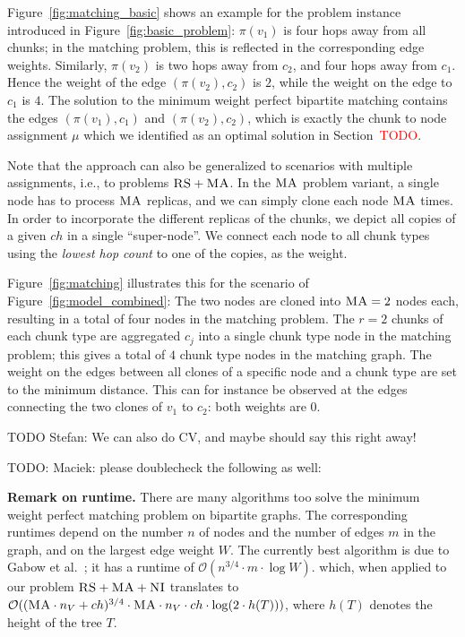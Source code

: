 \documentclass[9pt,twocolumn]{scrartcl}
\newcommand{\carlo}[1]{\textcolor{red}{#1}}
\newcommand{\MaFactor}{\ensuremath{\textsc{MA}}}
\newcommand{\RedundancyFactor}{\ensuremath{r}}
\newcommand{\VmChunkAssignment}{\mu}
\newcommand{\NodeMapping}{\pi}
\newcommand{\ChunkType}{\ensuremath{textsc{ct}}}
\newcommand{\VirtualNode}{v}
\newcommand{\achunk}{\ensuremath{c}}
\newcommand{\CC}{\textsc{NI}}
\newcommand{\RS}{\textsc{RS}}
\newcommand{\MA}{\textsc{MA}}
\newcommand{\Tree}{\ensuremath{T}}
\newcommand{\Vms}{\ensuremath{n_V}}
\newcommand{\ChunkTypes}{\ensuremath{ch}}
\begin{document}
Figure~\ref{fig:matching_basic} shows an example for the problem instance introduced in 
Figure~\ref{fig:basic_problem}: $\NodeMapping(\VirtualNode_1)$ is four hops
away from all chunks; in the matching problem, this is 
reflected in the corresponding edge
weights. Similarly, $\NodeMapping(\VirtualNode_2)$ is
two hops away from $\achunk_2$, and four hops away from $\achunk_1$. Hence the
weight of the edge $(\NodeMapping(\VirtualNode_2),\achunk_2)$ is $2$, while the
weight on the edge to $\achunk_1$ is $4$. The solution to the minimum weight
perfect bipartite matching contains the edges $(\NodeMapping(\VirtualNode_1),
\achunk_1)$ and $(\NodeMapping(\VirtualNode_2),
\achunk_2)$, which is exactly the chunk to node assignment $\VmChunkAssignment$
which we identified as an optimal solution in Section~\carlo{TODO}.

Note that the approach can also be generalized to scenarios with multiple assignments,
i.e., to problems 
$\RS+\MA$. In the $\MA$ problem variant, a single node has to process 
$\MaFactor$ replicas, and we can simply clone each node $\MaFactor$ times.
In order to incorporate the different
replicas of the chunks, we depict all copies of a given $\ChunkTypes$ in a
single %
``super-node''. We connect each node to all chunk types using the
\emph{lowest hop count} to one of the copies, as the weight.

Figure~\ref{fig:matching} illustrates this for the scenario of
Figure~\ref{fig:model_combined}: The two nodes are
cloned into $\MaFactor = 2$ nodes each, resulting in a total of four nodes in
the matching problem. The $\RedundancyFactor = 2$ chunks of each chunk type are
aggregated $\achunk_j$ into a single chunk type node in the matching problem;
this gives a total of $4$ chunk type nodes in the matching graph. The weight
on the edges between all clones of a specific node and a chunk type are set to
the minimum distance. This can for instance be observed at the edges connecting
the two clones of $\VirtualNode_1$ to $\achunk_2$: both weights are 0.

TODO Stefan: We can also do CV, and maybe should say this right away!

TODO: Maciek: please doublecheck the following as well:

\textbf{Remark on runtime.} There are many algorithms too solve the minimum weight 
perfect matching problem on bipartite
graphs. The corresponding runtimes depend on  the number $n$ of nodes and
the number of edges $m$ in the
graph, and on the largest edge weight $W$. The currently best algorithm is due to 
Gabow et al.~\cite{gabow_scaling_algorithm}; it has a runtime of $\mathcal{O}(n^{3/4}
\cdot m \cdot \log W)$.  which, when applied to our problem $\RS+\MA+\CC$ translates to $\mathcal{O}((\MaFactor \cdot \Vms +
\ChunkTypes)^{3/4} \cdot  \MaFactor \cdot \Vms \cdot \ChunkTypes \cdot \log
(2 \cdot h(\Tree)))$, where $h(\Tree)$ denotes the height of the tree $\Tree$.
\end{document}
